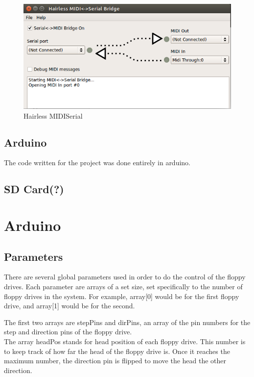 \documentclass[11pt, a4paper]{report}
\begin{document}
\begin{figure}[H]
\hspace*{-2cm}    
    \centering
    \includegraphics[width=.75\textwidth]{MIDISerial_Bridge.png}
    \caption{Hairless MIDISerial}
    \label{fig:hairless}
\end{figure} 

\section{Arduino}

The code written for the project was done entirely in arduino. 

\section{SD Card(?)}

\chapter{Arduino}

\section{Parameters}
There are several global parameters used in order to do the control of the floppy drives. Each parameter are arrays of a set size, set specifically to the number of floppy drives in the system. For example, array[0] would be for the first floppy drive, and array[1] would be for the second. 



The first two arrays are stepPins and dirPins, an array of the pin numbers for the step and direction pins of the floppy drive. \\

The array headPos stands for head position of each floppy drive. This number is to keep track of how far the head of the floppy drive is. Once it reaches the maximum number, the direction pin is flipped to move the head the other direction. \\
\end{document}
